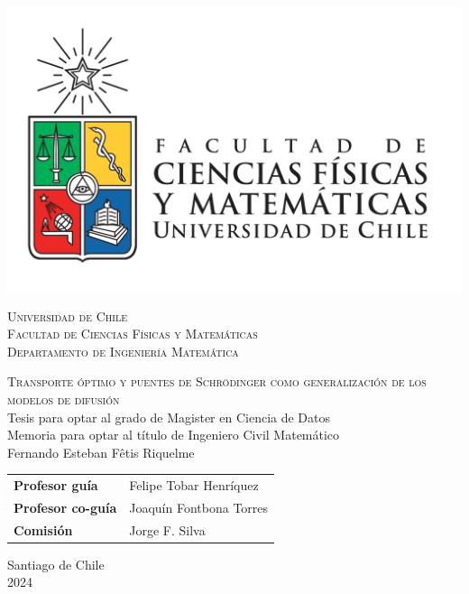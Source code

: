 \begin{titlepage}
	\hspace{0cm}\vspace{-2cm}
	\begin{LARGE}

		\begin{minipage}{0.12\linewidth}
			\includegraphics[width=\textwidth]{images/uchile}
		\end{minipage}
		\hfill
		\begin{minipage}{0.87\linewidth}
			\vspace{2cm}
			{\scshape
				Universidad de Chile\\
				Facultad de Ciencias Físicas y Matemáticas\\
				Departamento de Ingeniería Matemática\\
			}
		\end{minipage}

		\centering

		\vspace{2cm}
		{\Huge\scshape
			Transporte óptimo y puentes de Schrödinger como generalización de los modelos de difusión}\\
		\vspace{2cm}
		Tesis para optar al grado de Magister en Ciencia de Datos\\
		\vspace{0.1cm}
		Memoria para optar al título de Ingeniero Civil Matemático\\

		\vspace{2cm}
		{\huge Fernando Esteban Fêtis Riquelme}\\
		\vspace{2cm}
		\begin{tabular}{ll}
			\textbf{Profesor guía}    & Felipe Tobar Henríquez  \\
			\textbf{Profesor co-guía} & Joaquín Fontbona Torres \\
			\textbf{Comisión} 		  & Jorge F. Silva \\
		\end{tabular}

		\vfill
		Santiago de Chile\\2024

	\end{LARGE}

\end{titlepage}